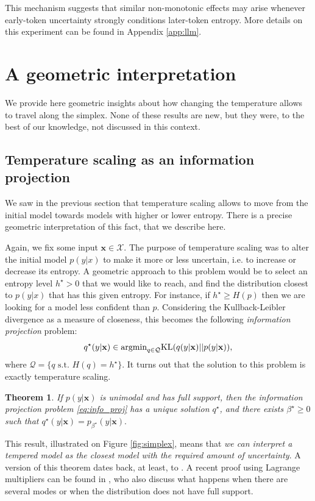 \documentclass[10pt,dvipsnames]{article}
\newcommand{\bx}{\mathbf{x}}%
\theoremstyle{plain}
\newtheorem{theorem}{Theorem}[section]
\theoremstyle{definition}
\theoremstyle{remark}
\begin{document}
This mechanism suggests that similar non-monotonic effects may arise whenever early-token uncertainty strongly conditions later-token entropy. More details on this experiment can be found in Appendix \ref{app:llm}.
\section{A geometric interpretation}
\label{sec:geometry}
We provide here geometric insights about how changing the temperature allows to travel along the simplex. None of these results are new, but they were, to the best of our knowledge, not discussed in this context.

\subsection{Temperature scaling as an information projection}

We saw in the previous section that temperature scaling allows to move from the initial model towards models with higher or lower entropy. There is a precise geometric interpretation of this fact, that we describe here.

Again, we fix some input $\bx \in \mathcal{X}$. The purpose of temperature scaling was to alter the initial model $p(y | x)$ to make it more or less uncertain, i.e. to increase or decrease its entropy. 
A geometric approach to this problem would be to select an entropy level $h^\star >0$ that we would like to reach, and find the distribution closest to $p(y | x)$ that has this given entropy. For instance, if $h^\star \geq H(p)$ then we are looking for a model less confident than $p$. Considering the Kullback-Leibler divergence as a measure of closeness, this becomes the following \emph{information projection} problem:
\begin{equation}
\label{eq:info_proj}
    q^\star(y |\bx) \in \textup{argmin}_{q \in \mathcal{Q}} \textup{KL} (q(y |\bx) || p(y |\bx)),
\end{equation}
where $\mathcal{Q} = \{q  \text{ s.t. } H(q) =  h^\star\}$. It turns out that the solution to this problem is exactly temperature scaling.


\begin{theorem}
\label{thm:info_proj:unique}
    If $p(y |\bx)$ is unimodal and has full support, then the information projection problem \eqref{eq:info_proj} has a unique solution $q^\star$, and there exists $\beta^\star\geq 0$ such that $q^\star(y |\bx) = p_{\beta^\star}(y|\bx).$
\end{theorem}
This result, illustrated on Figure \ref{fig:simplex}, means that \emph{we can interpret a tempered model as the closest model with the required amount of uncertainty}.
A version of this theorem dates back, at least, to \citet{sgarro1978informational}. A recent proof using Lagrange multipliers can be found in \citet[Theorem 1]{girardin2016escort}, who also discuss what happens when there are several modes or when the distribution does not have full support.
\end{document}
